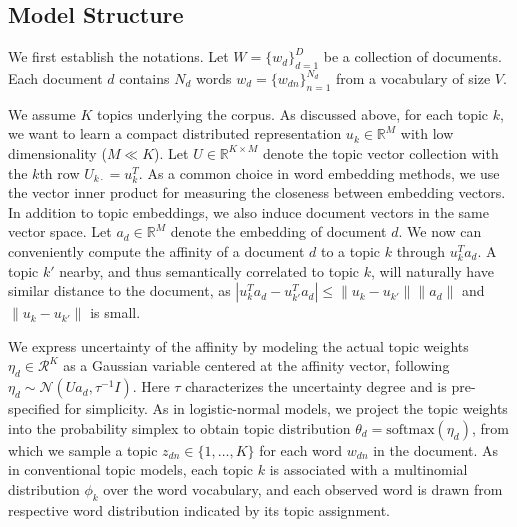 \documentclass[sigconf]{acmart}
\renewcommand*{\bm}[1]{#1}%
\begin{document}
\subsection{Model Structure}\label{sec:struct}

We first establish the notations. Let $\bm{W} = \{\bm{w}_d\}_{d=1}^{D}$ be a collection of documents. Each document $d$ contains $N_d$ words $\bm{w}_d = \{w_{dn}\}_{n=1}^{N_d}$ from a vocabulary of size $V$. 

We assume $K$ topics underlying the corpus. As discussed above, for each topic $k$, we want to learn a compact distributed representation $\bm{u}_k \in \mathbb{R}^{M}$ with low dimensionality ($M\ll K$). Let $\bm{U}\in \mathbb{R}^{K\times M}$ denote the topic vector collection with the $k$th row $\bm{U}_{k\cdot} = \bm{u}_k^{T}$. As a common choice in word embedding methods, we use the vector inner product for measuring the closeness between embedding vectors. 
%
In addition to topic embeddings, we also induce document vectors in the same vector space. Let $\bm{a}_d \in \mathbb{R}^{M}$ denote the embedding of document $d$. We now can conveniently compute the affinity of a document $d$ to a topic $k$ through $\bm{u}_k^T\bm{a}_d$. A topic $k'$ nearby, and thus semantically correlated to topic $k$, will naturally have similar distance to the document, as $|\bm{u}_k^T\bm{a}_d - \bm{u}_{k'}^T\bm{a}_d| \leq \|\bm{u}_k-\bm{u}_{k'}\|\|\bm{a}_d\|$ and $\|\bm{u}_k-\bm{u}_{k'}\|$ is small.

We express uncertainty of the affinity by modeling the actual topic weights $\bm{\eta}_d \in \mathcal{R}^{K}$ as a Gaussian variable centered at the affinity vector, following $\bm{\eta}_d \sim \mathcal{N}(\bm{U}\bm{a}_d, \tau^{-1}\bm{I})$. Here $\tau$ characterizes the uncertainty degree and is pre-specified for simplicity. 
%
As in logistic-normal models, we project the topic weights into the probability simplex to obtain topic distribution $\bm{\theta}_{d} = \text{softmax}(\bm{\eta}_d)$, from which we sample a topic $z_{dn}\in\{1,\dots,K\}$ for each word $w_{dn}$ in the document. As in conventional topic models, each topic $k$ is associated with a multinomial distribution $\bm{\phi}_k$ over the word vocabulary, and each observed word is drawn from respective word distribution indicated by its topic assignment.
\end{document}
